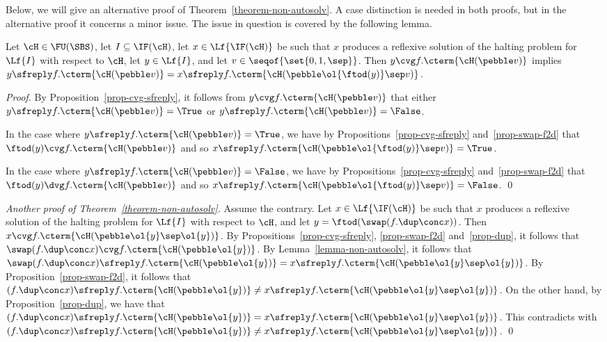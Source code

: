 \documentclass[fleqn]{llncs}
\begin{document}
Below, we will give an alternative proof of
Theorem~\ref{theorem-non-autosolv}.
A case distinction is needed in both proofs, but in the alternative
proof it concerns a minor issue.
The issue in question is covered by the following lemma.
\begin{lemma}
\label{lemma-non-autosolv}
Let $\cH \in \FU(\SBS)$, let $I \subseteq \IF(\cH)$,
let $x \in \Lf{\IF(\cH)}$ be such that $x$ produces a reflexive solution
of the halting problem for $\Lf{I}$ with respect to $\cH$,
let $y \in \Lf{I}$, and let $v \in \seqof{\set{0,1,\sep}}$.
Then
$y \cvg f.\cterm{\cH(\pebble v)}$ implies
$y \sfreply f.\cterm{\cH(\pebble v)} =
 x \sfreply f.\cterm{\cH(\pebble \ol{\ftod(y)} \sep v)}$.
\end{lemma}
\begin{proof}
By Proposition~\ref{prop-cvg-sfreply}, it follows from
$y \cvg f.\cterm{\cH(\pebble v)}$ that either
$y \sfreply f.\cterm{\cH(\pebble v)} = \True$ or
$y \sfreply f.\cterm{\cH(\pebble v)} = \False$.

In the case where $y \sfreply f.\cterm{\cH(\pebble v)} = \True$, we have
by Propositions~\ref{prop-cvg-sfreply} and~\ref{prop-swap-f2d} that
$\ftod(y) \cvg f.\cterm{\cH(\pebble v)}$ and so
$x \sfreply f.\cterm{\cH(\pebble \ol{\ftod(y)} \sep v)} = \True$.

In the case where $y \sfreply f.\cterm{\cH(\pebble v)} = \False$, we have
by Propositions~\ref{prop-cvg-sfreply} and~\ref{prop-swap-f2d} that
$\ftod(y) \dvg f.\cterm{\cH(\pebble v)}$ and so
$x \sfreply f.\cterm{\cH(\pebble \ol{\ftod(y)} \sep v)} = \False$.
\qed
\end{proof}

\begin{trivlist}
\item
\emph{Another proof of Theorem~\ref{theorem-non-autosolv}.}
Assume the contrary.
Let $x \in \Lf{\IF(\cH)}$ be such that $x$ produces a reflexive solution
of the halting problem for $\Lf{I}$ with re\-spect to $\cH$, and
let $y = \ftod(\swap(f.\dup \conc x))$.
Then $x \cvg f.\cterm{\cH(\pebble \ol{y} \sep \ol{y})}$.
By Propo\-sitions~\ref{prop-cvg-sfreply}, \ref{prop-swap-f2d}
and~\ref{prop-dup}, it follows that
$\swap(f.\dup \conc x) \cvg f.\cterm{\cH(\pebble \ol{y})}$.
By Lemma~\ref{lemma-non-autosolv}, it follows that
$\swap(f.\dup \conc x) \sfreply f.\cterm{\cH(\pebble \ol{y})} =
  x \sfreply f.\cterm{\cH(\pebble \ol{y} \sep \ol{y})}$.
By Proposition~\ref{prop-swap-f2d}, it follows that
$(f.\dup \conc x) \sfreply f.\cterm{\cH(\pebble \ol{y})} \neq
 x \sfreply f.\cterm{\cH(\pebble \ol{y} \sep \ol{y})}$.
On the other hand, by Propo\-sition~\ref{prop-dup}, we have that
$(f.\dup \conc x) \sfreply f.\cterm{\cH(\pebble \ol{y})} =
 x \sfreply f.\cterm{\cH(\pebble \ol{y} \sep \ol{y})}$.
This contradicts with
$(f.\dup \conc x) \sfreply f.\cterm{\cH(\pebble \ol{y})} \neq
 x \sfreply f.\cterm{\cH(\pebble \ol{y} \sep \ol{y})}$.
\qed
\end{trivlist}
\end{document}
